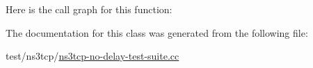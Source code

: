 Here is the call graph for this function\+:




The documentation for this class was generated from the following file\+:\begin{DoxyCompactItemize}
\item 
test/ns3tcp/\hyperlink{ns3tcp-no-delay-test-suite_8cc}{ns3tcp-\/no-\/delay-\/test-\/suite.\+cc}\end{DoxyCompactItemize}
